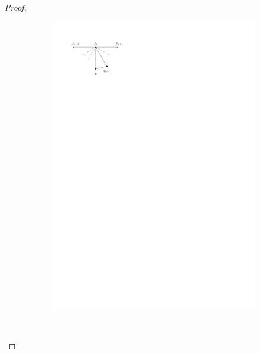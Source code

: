 \begin{proof}
      \begin{figure}[t]
        \centering
        \begin{subfigure}[t]{0.4\linewidth}
            \centering
            \includegraphics[]{unifiedAlgo/img/walkProofA}
            \caption{}
        \end{subfigure}%
        ~
        \begin{subfigure}[t]{0.4\linewidth}
            \centering

\end{subfigure}
\end{figure}
\end{proof}
